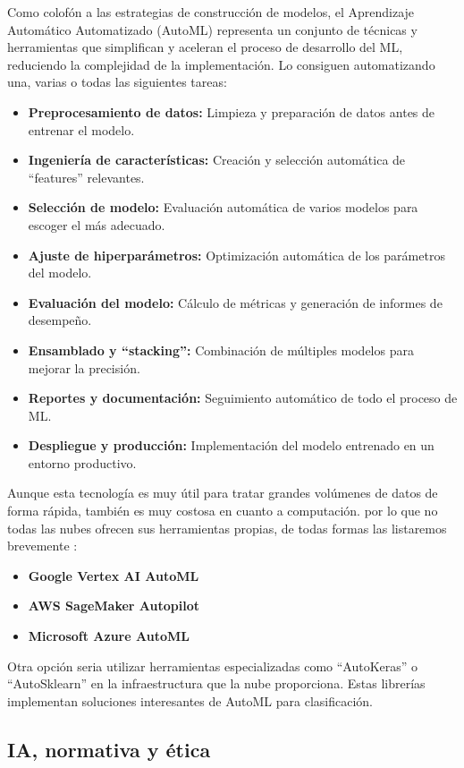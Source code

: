 Como colofón a las estrategias de construcción de modelos, el Aprendizaje Automático Automatizado (AutoML) representa un conjunto de técnicas y herramientas que simplifican y aceleran el proceso de desarrollo del ML, reduciendo la complejidad de la implementación. Lo consiguen automatizando una, varias o todas las siguientes tareas:
\begin{itemize}
	\item \textbf{Preprocesamiento de datos:} Limpieza y preparación de datos antes de entrenar el modelo.
	\item \textbf{Ingeniería de características:} Creación y selección automática de ``features'' relevantes.
	\item \textbf{Selección de modelo:} Evaluación automática de varios modelos para escoger el más adecuado.
	\item \textbf{Ajuste de hiperparámetros:} Optimización automática de los parámetros del modelo.
	\item \textbf{Evaluación del modelo:} Cálculo de métricas y generación de informes de desempeño.
	\item \textbf{Ensamblado y ``stacking'':} Combinación de múltiples modelos para mejorar la precisión.
	\item \textbf{Reportes y documentación:} Seguimiento automático de todo el proceso de ML.
	\item \textbf{Despliegue y producción:} Implementación del modelo entrenado en un entorno productivo.
\end{itemize}
Aunque esta tecnología es muy útil para tratar grandes volúmenes de datos de forma rápida, también es muy costosa en cuanto a computación.  por lo que no todas las nubes ofrecen sus herramientas propias, de todas formas las listaremos brevemente \citep{comparisonAutoMLServices}:
\begin{itemize}
	\item \textbf{Google Vertex AI AutoML} 
	\item \textbf{AWS SageMaker Autopilot} 
	\item \textbf{Microsoft Azure AutoML}
\end{itemize}

Otra opción seria utilizar herramientas especializadas como ``AutoKeras'' \citep{AutoKerasAutoML} o ``AutoSklearn'' \citep{AutoSklearnAutoML} en la infraestructura que la nube proporciona. Estas librerías implementan soluciones interesantes de AutoML para clasificación.

\subsection{IA, normativa y ética}

